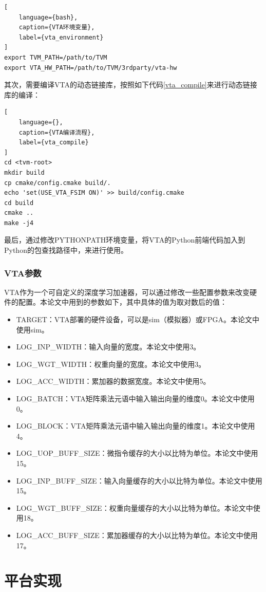 \begin{lstlisting}[
    language={bash},
    caption={VTA环境变量},
    label={vta_environment}
]
export TVM_PATH=/path/to/TVM
export VTA_HW_PATH=/path/to/TVM/3rdparty/vta-hw
\end{lstlisting}

其次，需要编译VTA的动态链接库，按照如下代码\ref{vta_compile}来进行动态链接库的编译：

\begin{lstlisting}[
    language={},
    caption={VTA编译流程},
    label={vta_compile}
]
cd <tvm-root>
mkdir build
cp cmake/config.cmake build/.
echo 'set(USE_VTA_FSIM ON)' >> build/config.cmake
cd build
cmake ..
make -j4
\end{lstlisting}

最后，通过修改PYTHONPATH环境变量，将VTA的Python前端代码加入到Python的包查找路径中，来进行使用。

\subsubsection{VTA参数}

VTA作为一个可自定义的深度学习加速器，可以通过修改一些配置参数来改变硬件的配置。本论文中用到的参数如下，其中具体的值为取对数后的值：
\begin{itemize}
    \item {TARGET：VTA部署的硬件设备，可以是sim（模拟器）或FPGA。本论文中使用sim。}
    \item {LOG\_INP\_WIDTH：输入向量的宽度。本论文中使用3。}
    \item {LOG\_WGT\_WIDTH：权重向量的宽度。本论文中使用3。}
    \item {LOG\_ACC\_WIDTH：累加器的数据宽度。本论文中使用5。}
    \item {LOG\_BATCH：VTA矩阵乘法元语中输入输出向量的维度0。本论文中使用0。}
    \item {LOG\_BLOCK：VTA矩阵乘法元语中输入输出向量的维度1。本论文中使用4。}
    \item {LOG\_UOP\_BUFF\_SIZE：微指令缓存的大小以比特为单位。本论文中使用15。}
    \item {LOG\_INP\_BUFF\_SIZE：输入向量缓存的大小以比特为单位。本论文中使用15。}
    \item {LOG\_WGT\_BUFF\_SIZE：权重向量缓存的大小以比特为单位。本论文中使用18。}
    \item {LOG\_ACC\_BUFF\_SIZE：累加器缓存的大小以比特为单位。本论文中使用17。}
\end{itemize}


\section{平台实现}

